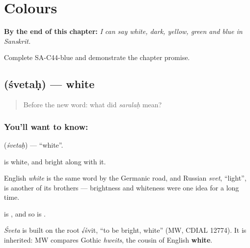 
\chapter{Colours}
\label{ch:sa-colours}

\begin{chapteropening}
\textbf{By the end of this chapter:} \emph{I can say white, dark, yellow, green and blue in Sanskrit.}

Complete SA-C44-blue and demonstrate the chapter promise.
\end{chapteropening}

\section[\texorpdfstring{\sk{श्वेतः} (śvetaḥ)}{श्वेतः (śvetaḥ)}]{ (śvetaḥ) — white}

\label{lesson:SA-C44-white}



\begin{quote}
Before the new word: what did \emph{saralaḥ} mean?
\end{quote}

\subsection*{You'll want to know: }
\textbf{} (\emph{śvetaḥ}) — \textquotedblleft{}white\textquotedblright{}.

\textbf{} is white, and bright along with it.

English \emph{white} is the same word by the Germanic road, and Russian \emph{svet}, \textquotedblleft{}light\textquotedblright{}, is another of its brothers — brightness and whiteness were one idea for a long time.

 is \textbf{}, and so is .

\begin{cousinweb}
\emph{Śveta} is built on the root √śvit, \textquotedblleft{}to be bright, white\textquotedblright{} (MW, CDIAL 12774). It is inherited: MW compares Gothic \emph{hweits}, the cousin of English \textbf{white}.
\end{cousinweb}

